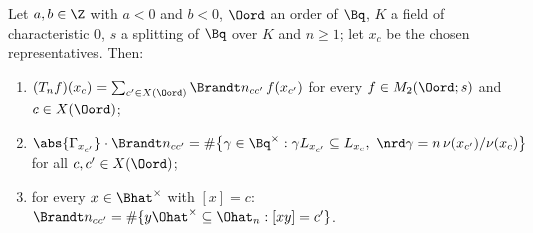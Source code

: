 Let $a,b\in\Z$ with $a<0$ and $b<0$, $\Oord$ an order of $\Bq$, $K$ a field of characteristic $0$, $s$ a splitting of $\Bq$ over $K$ and
$n\ge1$; let $x_c$ be the chosen representatives. Then:
\begin{enumerate}[label=(\alph*)]
\item $(T_nf)(x_c)=\sum_{c'\in X(\Oord)}\Brandt n_{cc'}\,f(x_{c'})$ for every $f\in M_2(\Oord;s)$ and $c\in X(\Oord)$;
\item $\abs{\Gamma_{x_{c'}}}\cdot\Brandt n_{cc'}=\#\bigl\{\gamma\in\Bq^\times:\gamma L_{x_{c'}}\subseteq L_{x_c},\ \nrd\gamma=n\,\nu(x_{c'})/\nu(x_c)\bigr\}$
  for all $c,c'\in X(\Oord)$;
\item for every $x\in\Bhat^\times$ with $[x]=c$: $\Brandt n_{cc'}=\#\{y\Ohat^\times\subseteq\Ohat_n:[xy]=c'\}$.
\end{enumerate}
